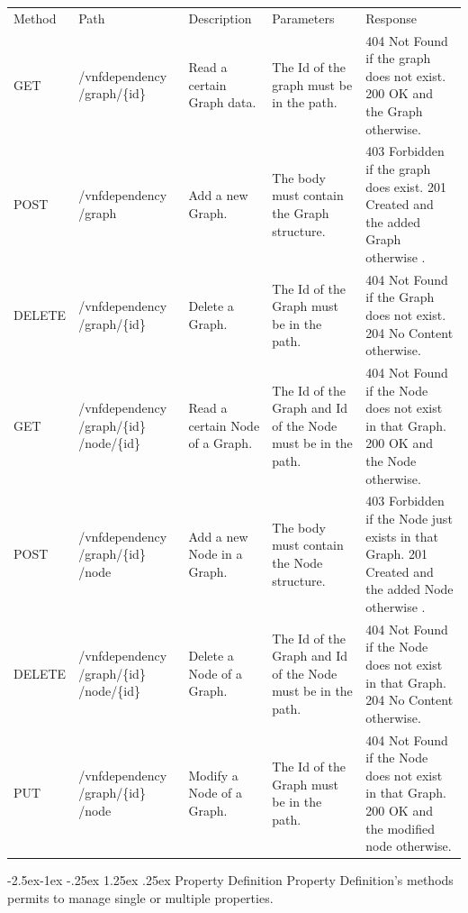 \documentclass[11pt, english]{article}
\makeatletter
\renewcommand\paragraph{\@startsection{paragraph}{4}{\z@}%
            {-2.5ex\@plus -1ex \@minus -.25ex}%
            {1.25ex \@plus .25ex}%
            {\normalfont\normalsize\bfseries}}
\makeatother
\begin{document}
\begin{tabular}{ |p{2cm}|m{3cm}|p{3cm}|p{3cm}|p{4cm}| }
    \hline
    \rowcolor{black} \multicolumn{5}{|c|}{\textcolor{white}{VNFDependency:Graph-Node}} \\
    \hline
    \rowcolor{Gray}
    Method & Path & Description & Parameters & Response \\
    \hline
    GET   & /vnfdependency /graph/\{id\} & Read a certain Graph data. & The Id of the graph must be in the path. & 404 Not Found if the graph does not exist. 200 OK and the Graph otherwise. \\
    \hline
    POST & /vnfdependency /graph & Add a new Graph. & The body must contain the Graph structure. & 403 Forbidden if the graph does exist. 201 Created and the added Graph otherwise . \\
    \hline
    DELETE & /vnfdependency /graph/\{id\} & Delete a Graph. & The Id of the Graph must be in the path. & 404 Not Found if the Graph does not exist. 204 No Content otherwise. \\
    \hline
    GET   & /vnfdependency /graph/\{id\} /node/\{id\} & Read a certain Node of a Graph. & The Id of the Graph and Id of the Node must be in the path. & 404 Not Found if the Node does not exist in that Graph. 200 OK and the Node otherwise. \\
    \hline
    POST & /vnfdependency /graph/\{id\} /node & Add a new Node in a Graph. & The body must contain the Node structure. & 403 Forbidden if the Node just exists in that Graph. 201 Created and the added Node otherwise . \\
    \hline
    DELETE & /vnfdependency /graph/\{id\} /node/\{id\} & Delete a Node of a Graph. & The Id of the Graph and Id of the Node must be in the path. & 404 Not Found if the Node does not exist in that Graph. 204 No Content otherwise. \\
    \hline
    PUT & /vnfdependency /graph/\{id\} /node & Modify a Node of a Graph. & The Id of the Graph must be in the path. & 404 Not Found if the Node does not exist in that Graph. 200 OK and the modified node otherwise. \\
    \hline
\end{tabular}

\newpage
\paragraph{Property Definition}
Property Definition's methods permits to manage single or multiple properties. \\
\end{document}
